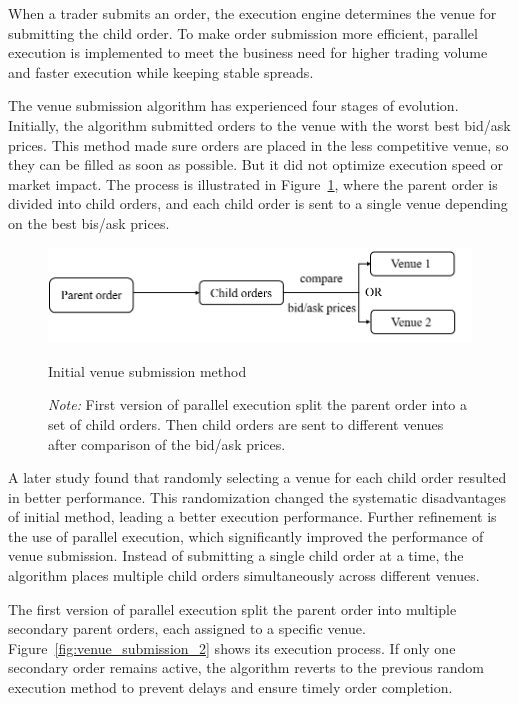 When a trader submits an order, the execution engine determines the venue for submitting the child order. To make order submission more efficient, parallel execution is implemented to meet the business need for higher trading volume and faster execution while keeping stable spreads.

The venue submission algorithm has experienced four stages of evolution. Initially, the algorithm submitted orders to the venue with the worst best bid/ask prices. This method made sure orders are placed in the less competitive venue, so they can be filled as soon as possible. But it did not optimize execution speed or market impact. The process is illustrated in Figure~\ref{fig:venue_submission_1}, where the parent order is divided into child orders, and each child order is sent to a single venue depending on the best bis/ask prices.

\begin{figure}[h]
    \centering
    \includegraphics[width=0.8\linewidth]{figures/venue_submission_1.png}
    \caption{Initial venue submission method}
    \caption*{\textit{Note:} First version of parallel execution split the parent order into a set of child orders. Then child orders are sent to different venues after comparison of the bid/ask prices.}
    \label{fig:venue_submission_1}
\end{figure}

A later study \citep{romy2023} found that randomly selecting a venue for each child order resulted in better performance. This randomization changed the systematic disadvantages of initial method, leading a better execution performance. Further refinement is the use of \gls{parallel execution}, which significantly improved the performance of venue submission. Instead of submitting a single child order at a time, the algorithm places multiple child orders simultaneously across different venues. 

The first version of parallel execution split the parent order into multiple secondary parent orders, each assigned to a specific venue. Figure~\ref{fig:venue_submission_2} shows its execution process. If only one secondary order remains active, the algorithm reverts to the previous random execution method to prevent delays and ensure timely order completion. 

